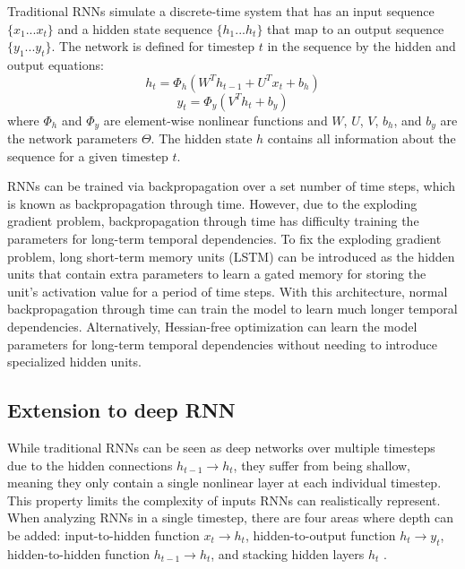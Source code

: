 Traditional RNNs simulate a discrete-time system that has an input sequence \(\{x_1...x_t\}\) and a hidden state sequence \(\{h_1...h_t\}\) that map to an output sequence \(\{y_1...y_t\}\). The network is defined for timestep \(t\) in the sequence by the hidden and output equations:
\begin{equation}
	h_t = \Phi_h(W^Th_{t-1} + U^Tx_t + b_h)
\end{equation}
\begin{equation}
	y_t = \Phi_y(V^Th_t + b_y)
\end{equation}
where \(\Phi_h\) and \(\Phi_y\) are element-wise nonlinear functions and \(W\), \(U\), \(V\), \(b_h\), and \(b_y\) are the network parameters \(\Theta\). The hidden state \(h\) contains all information about the sequence for a given timestep \(t\).

RNNs can be trained via backpropagation over a set number of time steps, which is known as backpropagation through time. However, due to the exploding gradient problem, backpropagation through time has difficulty training the parameters for long-term temporal dependencies. To fix the exploding gradient problem, long short-term memory units (LSTM) \cite{lstm} can be introduced as the hidden units that contain extra parameters to learn a gated memory for storing the unit's activation value for a period of time steps. With this architecture, normal backpropagation through time can train the model to learn much longer temporal dependencies. Alternatively, Hessian-free optimization \cite{hessian_free} can learn the model parameters for long-term temporal dependencies without needing to introduce specialized hidden units.

\subsection{Extension to deep RNN}\label{deep_rnn}
While traditional RNNs can be seen as deep networks over multiple timesteps due to the hidden connections \(h_{t-1} \rightarrow h_t\), they suffer from being shallow, meaning they only contain a single nonlinear layer at each individual timestep. This property limits the complexity of inputs RNNs can realistically represent. When analyzing RNNs in a single timestep, there are four areas where depth can be added: input-to-hidden function \(x_t \rightarrow h_t\), hidden-to-output function \(h_t \rightarrow y_t\), hidden-to-hidden function \(h_{t-1} \rightarrow h_t\), and stacking hidden layers \(h_t\) \cite{deep_rnn}.

